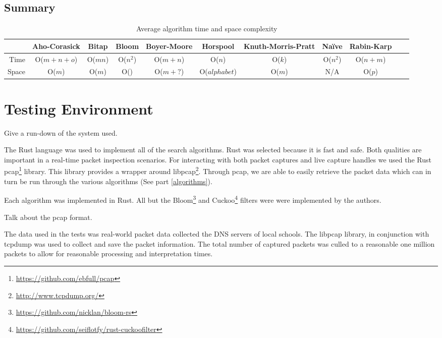 \documentclass{article}
\begin{document}
\subsection{Summary}

\begin{table}[h!bt]
  \centering
  \begin{tabular}{r|cccccccccc}
    & Aho-Corasick & Bitap & Bloom & Boyer-Moore & Horspool & Knuth-Morris-Pratt & Na{\"i}ve & Rabin-Karp\\
    \hline
    Time & O(\(m + n + o\)) & O(\(mn\)) & O(\(n^2\)) & O(\(m+n\)) & O(\(n\)) & O(\(k\)) & O(\(n^2\)) & O(\(n + m\)) \\
    Space & O(\(m\)) & O(\(m\)) & O(\(\)) & O(\(m + ?\)) & O(\(alphabet\)) & O(\(m\)) & N/A & O(\(p\))
  \end{tabular}
  \caption{Average algorithm time and space complexity}
  \label{table:algorithm-summary}
\end{table}


\section{Testing Environment} \label{sec:testing-environment}
Give a run-down of the system used.

The Rust language was used to implement all of the search algorithms. Rust was selected because it is fast and safe. Both  qualities are important in a real-time packet inspection scenarios. For interacting with both packet captures and live capture handles we used the Rust pcap\footnote{\url{https://github.com/ebfull/pcap}} library. This library provides a wrapper around libpcap\footnote{\url{http://www.tcpdump.org/}}. Through pcap, we are able to easily retrieve the packet data which can in turn be run through the various algorithms (See part \ref{algorithms}).

Each algorithm was implemented in Rust. All but the Bloom\footnote{\url{https://github.com/nicklan/bloom-rs}} \cite{Bloom1970} and Cuckoo\footnote{\url{https://github.com/seiflotfy/rust-cuckoofilter}} \cite{Fan2014} filters were were implemented by the authors.

Talk about the pcap format.

The data used in the tests was real-world packet data collected the DNS servers of local schools. The libpcap library, in conjunction with tcpdump was used to collect and save the packet information. The total number of captured packets was culled to a reasonable one million packets to allow for reasonable processing and interpretation times.
\end{document}
